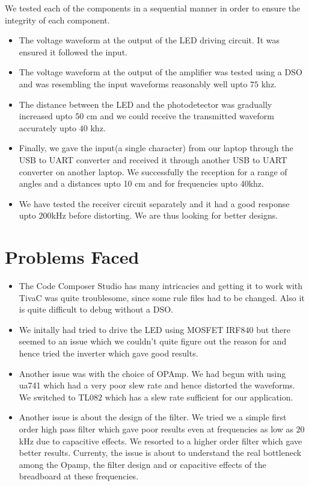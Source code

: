 \documentclass{article}
\begin{document}
We tested each of the components in a sequential manner in order to ensure the integrity of each component.
\begin{itemize}
\item The voltage waveform at the output of the LED driving circuit. It was ensured it followed the input. 
\item The voltage waveform at the output of the amplifier was tested using a DSO and was resembling the input waveforms reasonably well upto $75$ khz. 
\item The distance between the LED and the photodetector was gradually increased upto 50 cm and we could receive the transmitted waveform accurately upto $40$ khz. 
\item Finally, we gave the input(a single character) from our laptop through the USB to UART converter and received it through another USB to UART converter on another laptop. We successfully the reception for a range of angles and a distances upto 10 cm and for frequencies upto 40khz. 
\item We have tested the receiver circuit separately and it had a good response upto $200$kHz before distorting. We are thus looking for better designs.
\end{itemize}

\section{Problems Faced}

\begin{itemize}
\item The Code Composer Studio has many intricacies and getting it to work with TivaC was quite troublesome, since some rule files had to be changed. Also it is quite difficult to debug without a DSO.  
\item We initally had tried to drive the LED using MOSFET IRF$840$ but there seemed to an issue which we couldn't quite figure out the reason for and hence tried the inverter which gave good results.
\item Another issue was with the choice of OPAmp. We had begun with using ua741 which had a very poor slew rate and hence distorted the waveforms. We switched to TL$082$ which has a slew rate sufficient for our application.
\item Another issue is about the design of the filter. We tried we a simple first order high pass filter which gave poor results even at frequencies as low as $20$kHz due to capacitive effects. We resorted to a higher order filter which gave better results. Currenty, the issue is about to understand the real bottleneck among the Opamp, the filter design and or capacitive effects of the breadboard at these frequencies.

\end{itemize}
\end{document}
